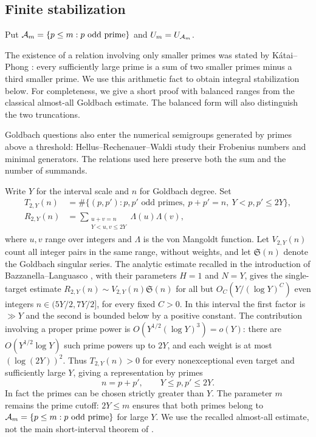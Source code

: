 \subsection{Finite stabilization}

Put $\mathcal A_m=\{p\le m:p\text{ odd prime}\}$ and $U_m=U_{\mathcal A_m}$.

The existence of a relation involving only smaller primes was stated by
K\'atai--Phong \cite[Theorem~3]{KP15}: every sufficiently large prime
is a sum of two smaller primes minus a third smaller prime. We use this
arithmetic fact to obtain integral stabilization below. For completeness,
we give a short proof with balanced ranges from the classical almost-all
Goldbach estimate. The balanced form will also distinguish the two
truncations.

Goldbach questions also enter the numerical semigroups generated by
primes above a threshold: Hellus--Rechenauer--Waldi
\cite{HellusRechenauerWaldi20} study their Frobenius numbers and
minimal generators. The relations used here preserve both the sum
and the number of summands.

Write $Y$ for the interval scale and $n$ for Goldbach degree. Set
\[
 \begin{aligned}
 T_{2,Y}(n)&=\#\{(p,p'):p,p'\text{ odd primes},\ p+p'=n,\ Y<p,p'\le2Y\},\\
 R_{2,Y}(n)&=\sum_{\substack{u+v=n\\Y<u,v\le2Y}}\Lambda(u)\Lambda(v),
 \end{aligned}
\]
where $u,v$ range over integers and $\Lambda$ is the von Mangoldt function.
Let $V_{2,Y}(n)$ count all integer pairs in the same range, without weights,
and let $\mathfrak S(n)$ denote the Goldbach singular series.
The analytic estimate recalled in the introduction of
Bazzanella--Languasco \cite[eq.~(2)]{BL00}, with their parameters
$H=1$ and $N=Y$, gives the single-target estimate
$R_{2,Y}(n)\sim V_{2,Y}(n)\mathfrak S(n)$ for all but
$O_C(Y/(\log Y)^C)$ even integers $n\in(5Y/2,7Y/2]$, for every fixed $C>0$.
In this interval the first factor is $\gg Y$
and the second is bounded below by a positive constant. The contribution
involving a proper prime power is $O(Y^{1/2}(\log Y)^3)=o(Y)$: there are
$O(Y^{1/2}\log Y)$ such prime powers up to $2Y$, and each weight is
at most $(\log(2Y))^2$. Thus $T_{2,Y}(n)>0$ for every nonexceptional
even target and sufficiently large $Y$, giving a representation by primes
\[
 n=p+p',\qquad Y\le p,p'\le2Y.
\]
In fact the primes can be chosen strictly greater than $Y$. The parameter
$m$ remains the prime cutoff: $2Y\le m$ ensures that both primes belong to
$\mathcal A_m=\{p\le m:p\text{ odd prime}\}$ for large $Y$. We use the recalled
almost-all estimate, not the main short-interval theorem of \cite{BL00}.

